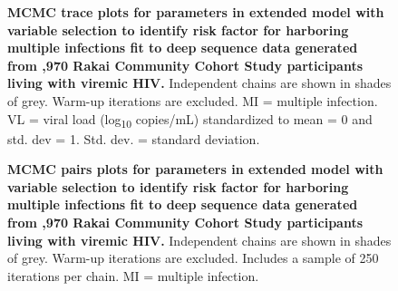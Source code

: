 \documentclass[10pt,letterpaper]{article}
\begin{document}
\begin{figure}[!ht]
\caption{{\bf MCMC trace plots for parameters in extended model with variable selection to identify risk factor for harboring multiple infections fit to deep sequence data generated from ,970 Rakai Community Cohort Study participants living with viremic HIV.} Independent chains are shown in shades of grey. Warm-up iterations are excluded. MI = multiple infection. VL = viral load (log\textsubscript{10} copies/mL) standardized to mean = 0 and std. dev = 1. Std. dev. = standard deviation.}
\end{figure}

\begin{figure}[!ht]
\caption{{\bf MCMC pairs plots for parameters in extended model with variable selection to identify risk factor for harboring multiple infections fit to deep sequence data generated from ,970 Rakai Community Cohort Study participants living with viremic HIV.} Independent chains are shown in shades of grey. Warm-up iterations are excluded. Includes a sample of 250 iterations per chain. MI = multiple infection. }
\end{figure}
\end{document}
